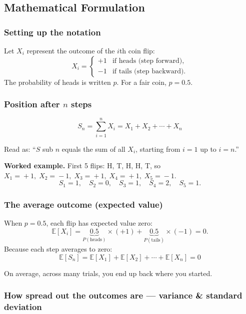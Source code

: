\documentclass[12pt, a4paper]{article}
\newcommand{\E}{\mathbb{E}}            %
\begin{document}
\subsection{Mathematical Formulation}

\subsubsection*{Setting up the notation}

Let $X_i$ represent the outcome of the $i$th coin flip:
\[
  X_i =
  \begin{cases}
    +1 & \text{if heads (step forward),} \\
    -1 & \text{if tails (step backward).}
  \end{cases}
\]
The probability of heads is written $p$.  For a fair coin, $p = 0.5$.

\subsubsection*{Position after $n$ steps}

\[
  \boxed{S_n = \sum_{i=1}^{n} X_i = X_1 + X_2 + \cdots + X_n}
\]

\begin{plainlanguage}
Read as: ``$S$ sub $n$ equals the sum of all $X_i$, starting from $i=1$ up to
$i=n$.''
\end{plainlanguage}

\textbf{Worked example.}  First 5 flips: H, T, H, H, T, so
$X_1\!=\!+1,\; X_2\!=\!-1,\; X_3\!=\!+1,\; X_4\!=\!+1,\; X_5\!=\!-1$.
\[
  S_1=1,\quad S_2=0,\quad S_3=1,\quad S_4=2,\quad S_5=1.
\]

\subsubsection*{The average outcome (expected value)}

When $p = 0.5$, each flip has expected value zero:
\[
  \E[X_i]
    = \underbrace{0.5}_{P(\text{heads})} \times (+1)
    + \underbrace{0.5}_{P(\text{tails})} \times (-1)
    = 0.
\]
Because each step averages to zero:
\[
  \boxed{\E[S_n] = \E[X_1] + \E[X_2] + \cdots + \E[X_n] = 0}
\]

\begin{plainlanguage}
On average, across many trials, you end up back where you started.
\end{plainlanguage}

\subsubsection*{How spread out the outcomes are --- variance \& standard deviation}
\end{document}
